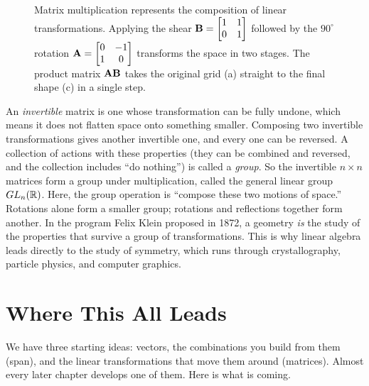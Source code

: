 \begin{figure}[H]
\caption{Matrix multiplication represents the composition of linear transformations. Applying the shear
$\mathbf{B}=\protect\begin{bmatrix}1&1\\0&1\end{bmatrix}$ followed by the $90^\circ$ rotation
$\mathbf{A}=\protect\begin{bmatrix}0&-1\\1&0\end{bmatrix}$ transforms the space in two stages. The product
matrix $\mathbf{A}\mathbf{B}$ takes the original grid (a) straight to the final shape (c) in a single step.}
\label{ch01:composition}
\end{figure}

\begin{connectionbox}
An \emph{invertible} matrix is one whose transformation can be fully undone, which means it does not
flatten space onto something smaller. Composing two invertible transformations gives another
invertible one, and every one can be reversed. A collection of actions with these properties (they can
be combined and reversed, and the collection includes ``do nothing'') is called a \emph{group}. So the
invertible $n\times n$ matrices form a group under multiplication, called the
general linear group $GL_n(\mathbb{R})$. Here, the group operation is ``compose these two motions of space.''
Rotations alone form a smaller group; rotations and reflections together form another. In the program
Felix Klein proposed in 1872, a geometry \emph{is} the study of the properties that survive a group
of transformations. This is why linear algebra leads directly to the study of symmetry, which runs
through crystallography, particle physics, and computer graphics.
\end{connectionbox}

\section{Where This All Leads}

We have three starting ideas: vectors, the combinations you build from them (span), and the linear
transformations that move them around (matrices). Almost every later chapter develops one of them.
Here is what is coming.

